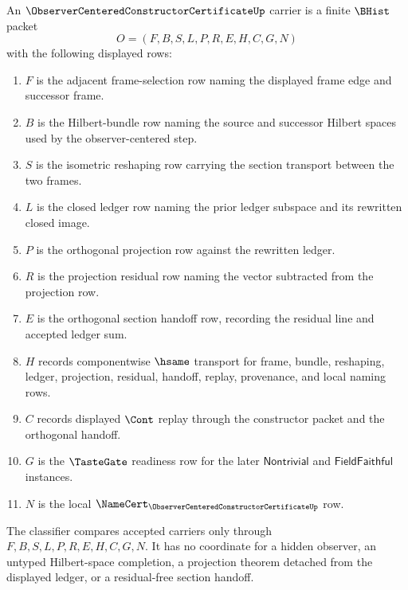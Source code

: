 \begin{definition}
\label{def:observer-centered-constructor-certificate-carrier}
An $\ObserverCenteredConstructorCertificateUp$ carrier is a finite $\BHist$ packet
$$
O=(F,B,S,L,P,R,E,H,C,G,N)
$$
with the following displayed rows:
\begin{enumerate}
\item $F$ is the adjacent frame-selection row naming the displayed frame edge and successor frame.
\item $B$ is the Hilbert-bundle row naming the source and successor Hilbert spaces used by the observer-centered step.
\item $S$ is the isometric reshaping row carrying the section transport between the two frames.
\item $L$ is the closed ledger row naming the prior ledger subspace and its rewritten closed image.
\item $P$ is the orthogonal projection row against the rewritten ledger.
\item $R$ is the projection residual row naming the vector subtracted from the projection row.
\item $E$ is the orthogonal section handoff row, recording the residual line and accepted ledger sum.
\item $H$ records componentwise $\hsame$ transport for frame, bundle, reshaping, ledger, projection, residual, handoff, replay, provenance, and local naming rows.
\item $C$ records displayed $\Cont$ replay through the constructor packet and the orthogonal handoff.
\item $G$ is the $\TasteGate$ readiness row for the later $\mathsf{Nontrivial}$ and $\mathsf{FieldFaithful}$ instances.
\item $N$ is the local $\NameCert_{\ObserverCenteredConstructorCertificateUp}$ row.
\end{enumerate}
The classifier compares accepted carriers only through $F,B,S,L,P,R,E,H,C,G,N$. It has no coordinate for a hidden observer, an untyped Hilbert-space completion, a projection theorem detached from the displayed ledger, or a residual-free section handoff.
\end{definition}


